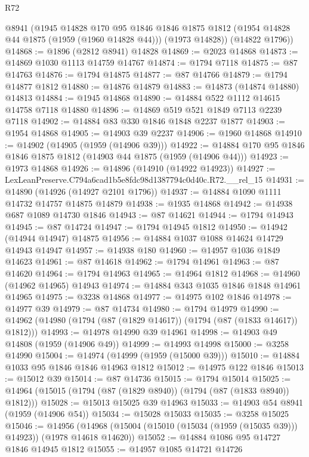 \begin{lexlean}{R72}
\begin{coremodule}
      @8941
      (@1945
        @14828
        @170
        @95
        @1846
        @1846
        @1875
        @1812
        (@1954 @14828 @44 @1875 (@1959 (@1960 @14828 @44)))
        (@1973 @14828))
      (@14822 @1796))
@14868 := @1896 (@2812 @8941) @14828
@14869 := @2023 @14868
@14873 := @14869 @1030 @1113 @14759 @14767
@14874 := @1794 @7118
@14875 := @87 @14763
@14876 := @1794 @14875
@14877 := @87 @14766
@14879 := @1794 @14877 @1812
@14880 := @14876 @14879
@14883 := @14873 (@14874 @14880) @14813
@14884 := @1945 @14868
@14890 := @14884 @522 @1112 @14615 @14758 @7118 @14880
@14896 := @14869 @519 @521 @1849 @7113 @2239 @7118
@14902 := @14884 @83 @330 @1846 @1848 @2237 @1877
@14903 := @1954 @14868
@14905 := @14903 @39 @2237
@14906 := @1960 @14868
@14910 := @14902 (@14905 (@1959 (@14906 @39)))
@14922 := @14884 @170 @95 @1846 @1846 @1875 @1812 (@14903 @44 @1875 (@1959 (@14906 @44)))
@14923 := @1973 @14868
@14926 := @14896 (@14910 (@14922 @14923))
@14927 := LexLeanPreserve.C794a6cad1b5e8fdc98d1387794c0d40c.R72.__rel_15
@14931 := @14890 (@14926 (@14927 @2101 @1796))
@14937 := @14884 @1090 @1111 @14732 @14757 @14875 @14879
@14938 := @1935 @14868
@14942 := @14938 @687 @1089 @14730 @1846
@14943 := @87 @14621
@14944 := @1794 @14943
@14945 := @87 @14724
@14947 := @1794 @14945 @1812
@14950 := @14942 (@14944 @14947) @14875
@14956 := @14884 @1037 @1088 @14624 @14729 @14943 @14947
@14957 := @14938 @180
@14960 := @14957 @1036 @1849 @14623
@14961 := @87 @14618
@14962 := @1794 @14961
@14963 := @87 @14620
@14964 := @1794 @14963
@14965 := @14964 @1812
@14968 := @14960 (@14962 @14965) @14943
@14974 := @14884 @343 @1035 @1846 @1848 @14961 @14965
@14975 := @3238 @14868
@14977 := @14975 @102 @1846
@14978 := @14977 @39
@14979 := @87 @14734
@14980 := @1794 @14979
@14990 := @14962 (@14980 (@1794 (@87 (@1829 @14617)) (@1794 (@87 (@1833 @14617)) @1812)))
@14993 := @14978 @14990 @39 @14961
@14998 := @14903 @49 @14808 (@1959 (@14906 @49))
@14999 := @14993 @14998
@15000 := @3258 @14990
@15004 := @14974 (@14999 (@1959 (@15000 @39)))
@15010 := @14884 @1033 @95 @1846 @1846 @14963 @1812
@15012 := @14975 @122 @1846
@15013 := @15012 @39
@15014 := @87 @14736
@15015 := @1794 @15014
@15025 := @14964 (@15015 (@1794 (@87 (@1829 @8940)) (@1794 (@87 (@1833 @8940)) @1812)))
@15028 := @15013 @15025 @39 @14963
@15033 := @14903 @54 @8941 (@1959 (@14906 @54))
@15034 := @15028 @15033
@15035 := @3258 @15025
@15046 := @14956
    (@14968 (@15004 (@15010 (@15034 (@1959 (@15035 @39))) @14923)) (@1978 @14618 @14620))
@15052 := @14884 @1086 @95 @14727 @1846 @14945 @1812
@15055 := @14957 @1085 @14721 @14726

\end{coremodule}
\end{lexlean}
